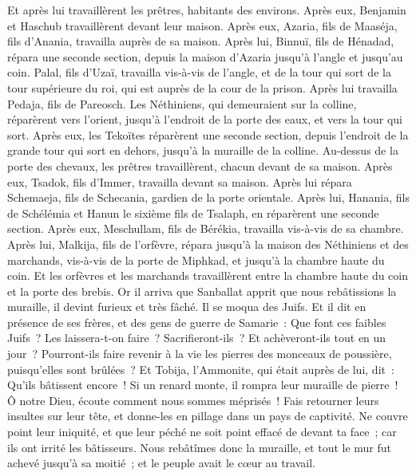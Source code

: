 \begin{multicols}{2}
Et après lui travaillèrent les prêtres, habitants des environs.
Après eux, Benjamin et Haschub travaillèrent devant leur maison. Après eux, Azaria, fils de Maaséja, fils d'Anania, travailla auprès de sa maison.
Après lui, Binnuï, fils de Hénadad, répara une seconde section, depuis la maison d'Azaria jusqu'à l'angle et jusqu'au coin.
Palal, fils d'Uzaï, travailla vis-à-vis de l'angle, et de la tour qui sort de la tour supérieure du roi, qui est auprès de la cour de la prison. Après lui travailla Pedaja, fils de Pareosch.
Les Néthiniens, qui demeuraient sur la colline, réparèrent vers l'orient, jusqu'à l'endroit de la porte des eaux, et vers la tour qui sort.
Après eux, les Tekoïtes réparèrent une seconde section, depuis l'endroit de la grande tour qui sort en dehors, jusqu'à la muraille de la colline.
Au-dessus de la porte des chevaux, les prêtres travaillèrent, chacun devant de sa maison.
Après eux, Tsadok, fils d'Immer, travailla devant sa maison. Après lui répara Schemaeja, fils de Schecania, gardien de la porte orientale.
Après lui, Hanania, fils de Schélémia et Hanun le sixième fils de Tsalaph, en réparèrent une seconde section. Après eux, Meschullam, fils de Bérékia, travailla vis-à-vis de sa chambre.
Après lui, Malkija, fils de l'orfèvre, répara jusqu'à la maison des Néthiniens et des marchands, vis-à-vis de la porte de Miphkad, et jusqu'à la chambre haute du coin.
Et les orfèvres et les marchands travaillèrent entre la chambre haute du coin et la porte des brebis.
\VerseOne{}Or il arriva que Sanballat apprit que nous rebâtissions la muraille, il devint furieux et très fâché. Il se moqua des Juifs.
Et il dit en présence de ses frères, et des gens de guerre de Samarie~: Que font ces faibles Juifs~? Les laissera-t-on faire~? Sacrifieront-ils~? Et achèveront-ils tout en un jour~? Pourront-ils faire revenir à la vie les pierres des monceaux de poussière, puisqu'elles sont brûlées~?
Et Tobija, l'Ammonite, qui était auprès de lui, dit~: Qu'ils bâtissent encore~! Si un renard monte, il rompra leur muraille de pierre~!
Ô notre Dieu, écoute comment nous sommes méprisés~! Fais retourner leurs insultes sur leur tête, et donne-les en pillage dans un pays de captivité.
Ne couvre point leur iniquité, et que leur péché ne soit point effacé de devant ta face~; car ils ont irrité les bâtisseurs.
Nous rebâtîmes donc la muraille, et tout le mur fut achevé jusqu'à sa moitié~; et le peuple avait le cœur au travail.

\end{multicols}

